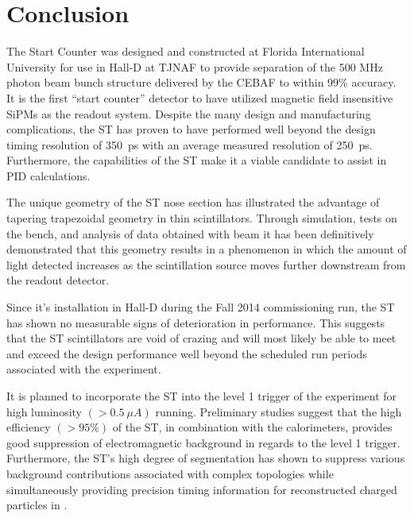 \section{Conclusion} \label{sec:conclusion}

The \gx{} Start Counter was designed and constructed at Florida International University for use in Hall-D at TJNAF to provide separation of the 500 MHz photon beam bunch structure delivered by the CEBAF to within 99\% accuracy.  It is the first ``start counter'' detector to have utilized magnetic field insensitive SiPMs as the readout system.  Despite the many design and manufacturing complications, the ST has proven to have performed well beyond the design timing resolution of 350~ps with an average measured resolution of 250~ps.  Furthermore, the capabilities of the ST make it a viable candidate to assist in PID calculations.

The unique geometry of the ST nose section has illustrated the advantage of tapering trapezoidal geometry in thin scintillators.  Through simulation, tests on the bench, and analysis of data obtained with beam it has been definitively demonstrated that this geometry results in a phenomenon in which the amount of light detected increases as the scintillation source moves further downstream from the readout detector.

Since it's installation in Hall-D during the Fall 2014 commissioning run, the ST has shown no measurable signs of deterioration in performance.  This suggests that the ST scintillators are void of crazing and will most likely be able to meet and exceed the design performance well beyond the scheduled run periods associated with the \gx{} experiment.

It is planned to incorporate the ST into the level 1 trigger of the \gx{} experiment for high luminosity $(> 0.5\ \mu A)$ running.  Preliminary studies suggest that the high efficiency $(> 95\%)$ of the ST, in combination with the calorimeters, provides good suppression of electromagnetic background in regards to the level 1 trigger.  Furthermore, the ST's high degree of segmentation has shown to suppress various background contributions associated with complex topologies while simultaneously providing precision timing information for reconstructed charged particles in \gx{}.